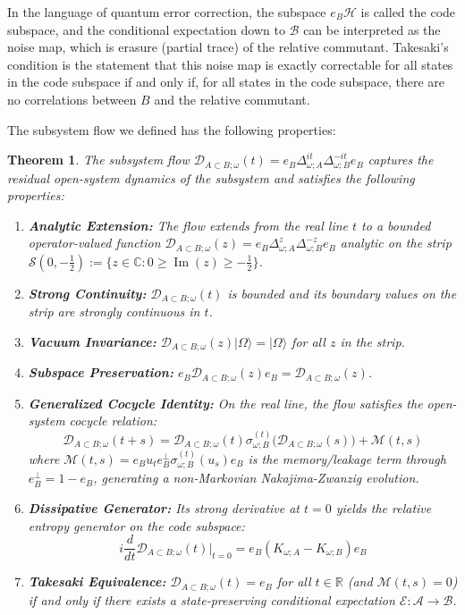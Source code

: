 \documentclass[a4paper,11pt]{article}
\newtheorem{theorem}{Theorem}
\theoremstyle{definition}
\newcommand{\mA}{\mathcal{A}}
\newcommand{\mB}{\mathcal{B}}
\newcommand{\mH}{\mathcal{H}}
\begin{document}
In the language of quantum error correction, the subspace $e_B\mH$ is called the code subspace, and 
the conditional expectation down to $\mB$ can be interpreted as the noise map, which is erasure (partial trace) of the relative commutant. Takesaki's condition is the statement that this noise map is exactly correctable for all states in the code subspace if and only if, for all states in the code subspace, there are no correlations between $B$ and the relative commutant.

The subsystem flow we defined has the following properties:
\begin{theorem}
The subsystem flow $\mathcal{D}_{A\subset B;\omega}(t) = e_B \Delta_{\omega;A}^{it} \Delta_{\omega;B}^{-it} e_B$ captures the residual open-system dynamics of the subsystem and satisfies the following properties:
\begin{enumerate}
    \item \textbf{Analytic Extension:} The flow extends from the real line $t$ to a bounded operator-valued function $\mathcal{D}_{A\subset B;\omega}(z) = e_B \Delta_{\omega;A}^{z} \Delta_{\omega;B}^{-z} e_B$ analytic on the strip $\mathcal{S}(0,- \tfrac{1}{2}) := \{z \in \mathbb{C} : 0 \ge \operatorname{Im}(z) \ge - \tfrac{1}{2}\}$.
    \item \textbf{Strong Continuity:} $\mathcal{D}_{A\subset B;\omega}(t)$ is bounded and its boundary values on the strip are strongly continuous in $t$.
    \item \textbf{Vacuum Invariance:} $\mathcal{D}_{A\subset B;\omega}(z)|\Omega\rangle = |\Omega\rangle$ for all $z$ in the strip.
    \item \textbf{Subspace Preservation:} $e_B \mathcal{D}_{A\subset B;\omega}(z) e_B = \mathcal{D}_{A\subset B;\omega}(z)$.
    \item \textbf{Generalized Cocycle Identity:} On the real line, the flow satisfies the open-system cocycle relation:
    \begin{equation}
        \mathcal{D}_{A\subset B;\omega}(t+s) = \mathcal{D}_{A\subset B;\omega}(t) \sigma^{(t)}_{\omega;B}\big(\mathcal{D}_{A\subset B;\omega}(s)\big) + \mathcal{M}(t,s)
    \end{equation}
    where $\mathcal{M}(t,s) = e_B u_t e_B^\perp \sigma^{(t)}_{\omega;B}(u_s) e_B$ is the memory/leakage term through $e_B^\perp = 1 - e_B$, generating a non-Markovian Nakajima-Zwanzig evolution.
    \item \textbf{Dissipative Generator:} Its strong derivative at $t=0$ yields the relative entropy generator on the code subspace:
    \begin{equation}
        i \frac{d}{dt} \mathcal{D}_{A\subset B;\omega}(t) \bigg|_{t=0} = e_B (K_{\omega;A} - K_{\omega;B}) e_B
    \end{equation}
    \item \textbf{Takesaki Equivalence:} $\mathcal{D}_{A\subset B;\omega}(t) = e_B$ for all $t \in \mathbb{R}$ (and $\mathcal{M}(t,s) = 0$) if and only if there exists a state-preserving conditional expectation $\mathcal{E}: \mA \to \mB$. 
\end{enumerate}
\end{theorem}
\end{document}
